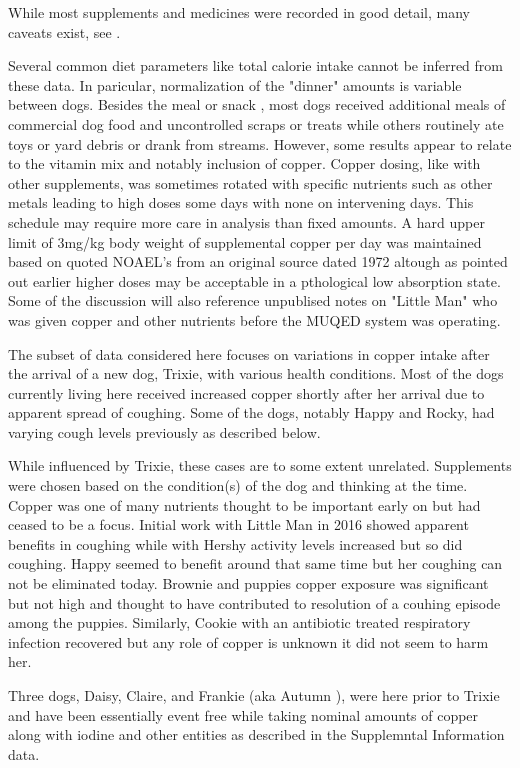 While most supplements and medicines were recorded 
in good detail,  many caveats exist, see .

Several common diet parameters like total calorie intake cannot be inferred
from these data.
In paricular, normalization of the "dinner" amounts is variable
between dogs.
Besides the meal or snack ,
most dogs received additional meals of commercial dog food
and uncontrolled scraps or treats while others
routinely ate toys or yard debris or drank from streams. However, some 
results appear to relate to the vitamin mix and notably
inclusion of copper. 
Copper dosing, like with other supplements,  was sometimes rotated 
with specific nutrients such as other metals
leading to high doses some days with none on intervening days. 
This schedule may require more care in analysis than fixed amounts.
A hard upper limit of
3mg/kg body weight of supplemental copper per day was maintained  based 
on quoted NOAEL's from an  original source dated  1972 \cite{NAP9782}
altough as pointed out earlier higher doses may be acceptable in 
a pthological low absorption state. 
Some of the discussion will also reference unpublised notes
on "Little Man" who was given copper and other 
nutrients before the MUQED system was operating.

The subset of data considered here focuses on variations in copper
intake after the arrival of a new dog, Trixie, with various health
conditions.  
Most of the dogs currently living here received increased copper
shortly after her arrival due to apparent
spread of coughing. 
Some of the dogs, notably Happy and Rocky, had varying cough levels
previously as described below.  

While influenced by Trixie, these cases are to some extent 
unrelated.  Supplements were 
chosen based on the condition(s) of the dog and thinking at the time.
Copper was one of many nutrients thought to be important early on
but had ceased to be a  focus. %
Initial work with Little Man in 2016 showed apparent benefits in coughing
while with Hershy activity levels increased but so did coughing.
Happy seemed to benefit around that same time but her coughing
can not be eliminated today. Brownie and puppies copper exposure was
significant but not high and thought to have contributed to resolution
of a couhing episode among the puppies. Similarly,  Cookie with
an antibiotic treated respiratory infection recovered
but any role of copper is unknown it did not seem to harm her.

 Three dogs, Daisy, Claire, and Frankie (aka Autumn ), were
here prior to Trixie and have been essentially event free while
taking nominal amounts of copper along with iodine and other
entities as described in the Supplemntal Information data. 

